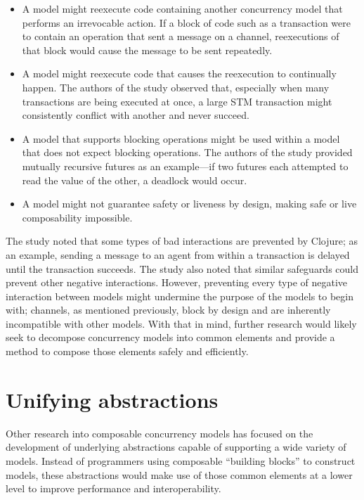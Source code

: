 \documentclass{sig-alternate}
\begin{document}
\begin{itemize}
  \item A model might reexecute code containing another concurrency model that performs an irrevocable action. If a block of code such as a transaction were to contain an operation that sent a message on a channel, reexecutions of that block would cause the message to be sent repeatedly.

  \item A model might reexecute code that causes the reexecution to continually happen. The authors of the study observed that, especially when many transactions are being executed at once, a large STM transaction might consistently conflict with another and never succeed.

  \item A model that supports blocking operations might be used within a model that does not expect blocking operations. The authors of the study provided mutually recursive futures as an example---if two futures each attempted to read the value of the other, a deadlock would occur.

  \item A model might not guarantee safety or liveness by design, making safe or live composability impossible.
\end{itemize}

The study noted that some types of bad interactions are prevented by Clojure; as an example, sending a message to an agent from within a transaction is delayed until the transaction succeeds. The study also noted that similar safeguards could prevent other negative interactions. However, preventing every type of negative interaction between models might undermine the purpose of the models to begin with; channels, as mentioned previously, block by design and are inherently incompatible with other models. With that in mind, further research would likely seek to decompose concurrency models into common elements and provide a method to compose those elements safely and efficiently.

\section{Unifying abstractions}

Other research into composable concurrency models has focused on the development of underlying abstractions capable of supporting a wide variety of models. Instead of programmers using composable ``building blocks'' to construct models, these abstractions would make use of those common elements at a lower level to improve performance and interoperability.
\end{document}
